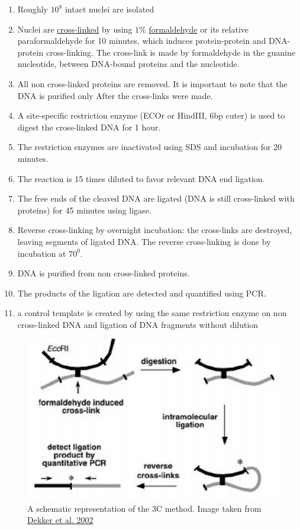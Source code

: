 \documentclass[12pt]{paper}
\begin{document}
\begin{enumerate}
\item Roughly $10^8$ intact nuclei are isolated
\item Nuclei are \href{http://en.wikipedia.org/wiki/Crosslinking_of_DNA}{cross-linked} by using $1\%$
\href{http://en.wikipedia.org/wiki/Formaldehyde}{formaldehyde} or its relative paraformaldehyde for 10 minutes, which induces protein-protein and DNA-protein cross-linking. The cross-link is made by formaldehyde in the guanine nucleotide, between DNA-bound proteins and the nucleotide. 
\item All non cross-linked proteins are removed.  It is important to note that the DNA is purified only After the cross-links were made.
\item A site-specific restriction enzyme (ECOr or HindIII, 6bp cuter) is used to digest the cross-linked DNA for 1 hour. 
\item The restriction enzymes are inactivated using SDS and incubation for 20 minutes.
\item The reaction is 15 times diluted to favor relevant DNA end ligation.
\item The free ends of the cleaved DNA are ligated (DNA is still cross-linked with proteins) for 45 minutes using ligase.
\item Reverse cross-linking by overnight incubation: the cross-links are destroyed, leaving segments of ligated DNA. The reverse cross-linking is done by incubation at $70^0$.
\item DNA is purified from non cross-linked proteins.
\item The products of the ligation are detected and quantified using PCR. 
\item a control template is created by using the same restriction enzyme on non cross-linked DNA and ligation of DNA fragments without dilution
\end{enumerate}

\begin{figure}[H]
\includegraphics[scale = 0.4]{3Cschematic}
\caption{\scriptsize{A schematic representation of the 3C method. Image taken from \href{http://www.sciencemag.org/content/295/5558/1306.full.pdf}{Dekker et al. 2002}\cite{dekker2002capturing}}}
\label{3Cschematic}
\end{figure}
\end{document}
